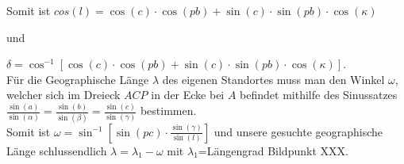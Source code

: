 Somit ist $cos(l) = \cos(c)\cdot \cos(pb) + \sin(c) \cdot \sin(pb) \cdot \cos(\kappa)$

und

$\delta  =\cos^{-1} [\cos(c) \cdot \cos(pb) + \sin(c) \cdot \sin(pb) \cdot \cos(\kappa)]$.
\\

Für die Geographische Länge $\lambda$ des eigenen Standortes muss man den Winkel $\omega$, welcher sich im Dreieck $ACP$ in der Ecke bei $A$ befindet mithilfe des Sinussatzes $\frac{\sin (a)}{\sin (\alpha)} =\frac{\sin (b)}{\sin (\beta)} = \frac{\sin (c)}{\sin (\gamma)}$ bestimmen. 
\\

Somit ist $\omega=\sin^{-1}[\sin(pc) \cdot \frac{\sin(\gamma)}{\sin(l)}]$ und unsere gesuchte geographische Länge schlussendlich 
$\lambda=\lambda_1 - \omega$ mit $\lambda_1$=Längengrad Bildpunkt XXX.
\newpage
\listoffigures